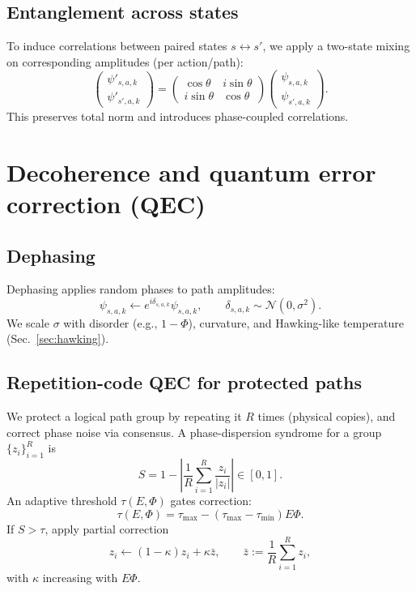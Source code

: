\documentclass[11pt]{article}
\begin{document}
\subsection{Entanglement across states}
To induce correlations between paired states $s\leftrightarrow s'$, we apply a two-state mixing on corresponding amplitudes (per action/path):
\begin{equation}
\begin{pmatrix}
\psi'_{s,a,k}\\
\psi'_{s',a,k}
\end{pmatrix}
=
\begin{pmatrix}
\cos\theta & i\sin\theta\\
i\sin\theta & \cos\theta
\end{pmatrix}
\begin{pmatrix}
\psi_{s,a,k}\\
\psi_{s',a,k}
\end{pmatrix}.
\end{equation}
This preserves total norm and introduces phase-coupled correlations.

\section{Decoherence and quantum error correction (QEC)}
\subsection{Dephasing}
Dephasing applies random phases to path amplitudes:
\begin{equation}
\psi_{s,a,k} \leftarrow e^{i\delta_{s,a,k}} \psi_{s,a,k},\qquad \delta_{s,a,k}\sim \mathcal{N}(0,\sigma^2).
\end{equation}
We scale $\sigma$ with disorder (e.g., $1-\Phi$), curvature, and Hawking-like temperature (Sec.~\ref{sec:hawking}).

\subsection{Repetition-code QEC for protected paths}
We protect a logical path group by repeating it $R$ times (physical copies), and correct phase noise via consensus. A phase-dispersion syndrome for a group $\{z_i\}_{i=1}^R$ is
\begin{equation}
S = 1 - \left|\frac{1}{R}\sum_{i=1}^R \frac{z_i}{|z_i|}\right|\in[0,1].
\end{equation}
An adaptive threshold $\tau(E,\Phi)$ gates correction:
\begin{equation}
\tau(E,\Phi)=\tau_{\max}-(\tau_{\max}-\tau_{\min})E\Phi.
\end{equation}
If $S>\tau$, apply partial correction
\begin{equation}
z_i \leftarrow (1-\kappa)z_i + \kappa \bar z,\qquad \bar z := \frac{1}{R}\sum_{i=1}^R z_i,
\end{equation}
with $\kappa$ increasing with $E\Phi$.
\end{document}
